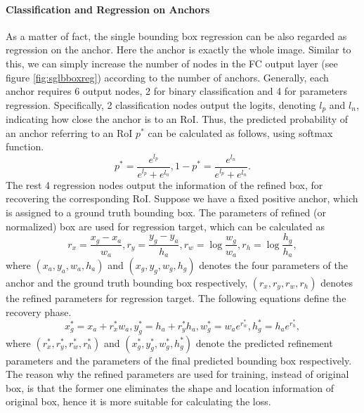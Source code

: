 \paragraph{Classification and Regression on Anchors}
As a matter of fact, the single bounding box regression can be also regarded as regression on the anchor. Here the anchor is exactly the whole image. Similar to this, we can simply increase the number of nodes in the FC output layer (see figure \ref{fig:sglbboxreg}) according to the number of anchors. Generally, each anchor requires 6 output nodes, 2 for binary classification and 4 for parameters regression. Specifically, 2 classification nodes output the logits, denoting $l_p$ and $l_n$, indicating how close the anchor is to an RoI. Thus, the predicted probability of an anchor referring to an RoI $p^*$ can be calculated as follows, using softmax function.
\begin{equation}
	p^* = \frac{e^{l_p}}{e^{l_p} + e^{l_n}}, 1 - p^* = \frac{e^{l_n}}{e^{l_p} + e^{l_n}}.
\end{equation}
The rest 4 regression nodes output the information of the refined box, for recovering the corresponding RoI. Suppose we have a fixed positive anchor, which is assigned to a ground truth bounding box. The parameters of refined (or normalized) box are used for regression target, which can be calculated as
\begin{equation}
	r_x = \frac{x_g - x_a}{w_a}, r_y = \frac{y_g - y_a}{h_a}, r_w = \log\frac{w_g}{w_a}, r_h = \log\frac{h_g}{h_a},
\end{equation}
where $(x_a, y_a, w_a, h_a)$ and $(x_g, y_g, w_g, h_g)$ denotes the four parameters of the anchor and the ground truth bounding box respectively, $(r_x, r_y, r_w, r_h)$ denotes the refined parameters for regression target. The following equations define the recovery phase.
\begin{equation}
	x_g^* = x_a + r_x^*w_a, y_g^* = h_a + r_y^*h_a, w_g^* = w_ae^{r_w^*}, h_g^* = h_ae^{r_h^*},
\end{equation}
where $(r_x^*, r_y^*, r_w^*, r_h^*)$ and $(x_g^*, y_g^*, w_g^*, h_g^*)$ denote the predicted refinement parameters and the parameters of the final predicted bounding box respectively. The reason why the refined parameters are used for training, instead of original box, is that the former one eliminates the shape and location information of original box, hence it is more suitable for calculating the loss.



